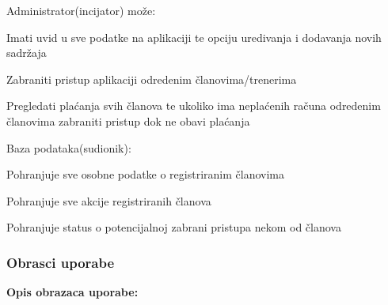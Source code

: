 \documentclass{article}
\begin{document}
\begin{packed_enum}
			\item Administrator(incijator) može:
			\begin{packed_enum}
				\item Imati uvid u sve podatke na aplikaciji te opciju uredivanja i dodavanja novih sadržaja
				\item Zabraniti pristup aplikaciji odredenim članovima/trenerima 
				\item Pregledati plaćanja svih članova te ukoliko ima neplaćenih računa odredenim članovima zabraniti pristup dok ne obavi plaćanja
			\end{packed_enum}
			\item Baza podataka(sudionik):
			\begin{packed_enum}
				\item Pohranjuje sve osobne podatke o registriranim članovima
				\item Pohranjuje sve akcije registriranih članova
				\item Pohranjuje status o potencijalnoj zabrani pristupa nekom od članova
			\end{packed_enum}
		\end{packed_enum}
		\eject
		
		\subsubsection{Obrasci uporabe}
		\noindent \textbf{Opis obrazaca uporabe:}\\
		
\end{document}
